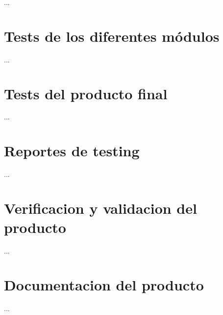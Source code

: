 ...

\section{Tests de los diferentes módulos}
\label{sec:pruebasHW}

...

\section{Tests del producto final}
\label{sec:pruebasHW}

...

\section{Reportes de testing}
\label{sec:pruebasHW}

...

\section{Verificacion y validacion del producto}
\label{sec:pruebasHW}

...

\section{Documentacion del producto }
\label{sec:pruebasHW}

...



